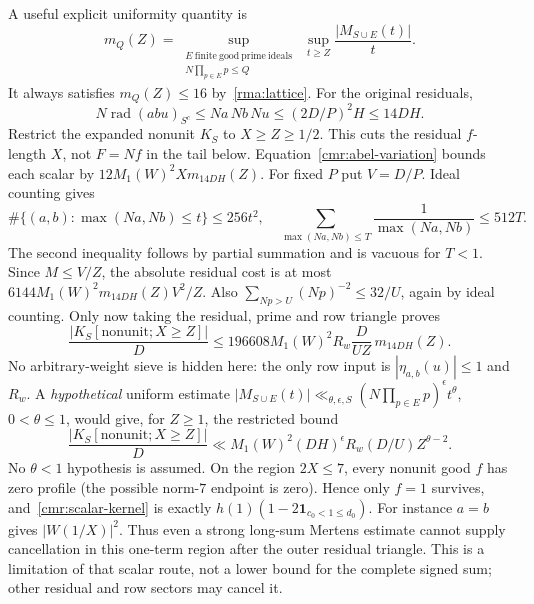 A useful explicit uniformity quantity is
\[
 m_Q(Z)=\sup_{\substack{E\ \mathrm{finite\ good\ prime\ ideals}\\
                       N\prod_{p\in E}p\le Q}}
         \ \sup_{t\ge Z}\frac{|M_{S\cup E}(t)|}{t}.
\]
It always satisfies $m_Q(Z)\le16$ by~\eqref{rma:lattice}.
For the original residuals,
\[
 N\operatorname{rad}(abu)_{S^c}
 \le Na\,Nb\,Nu\le(2D/P)^2H\le14DH.
\]
Restrict the expanded nonunit $K_S$ to $X\ge Z\ge1/2$.
This cuts the residual $f$-length $X$, not $F=Nf$ in the tail below.
Equation~\eqref{cmr:abel-variation} bounds each scalar by
$12M_1(W)^2Xm_{14DH}(Z)$.
For fixed $P$ put $V=D/P$. Ideal counting gives
\[
 \#\{(a,b):\max(Na,Nb)\le t\}\le256t^2,
 \quad
 \sum_{\max(Na,Nb)\le T}\frac1{\max(Na,Nb)}\le512T.
\]
The second inequality follows by partial summation and is vacuous for
$T<1$. Since $M\le V/Z$, the absolute residual cost is at most
$6144M_1(W)^2m_{14DH}(Z)V^2/Z$.
Also $\sum_{Np>U}(Np)^{-2}\le32/U$, again by ideal counting.
Only now taking the residual, prime and row triangle proves
\begin{equation}\label{cmr:mertens-budget}
 \frac{|K_S[\mathrm{nonunit};X\ge Z]|}D
 \le196608M_1(W)^2R_w\frac D{UZ}\,m_{14DH}(Z).
\end{equation}
No arbitrary-weight sieve is hidden here: the only row input is
$|\eta_{a,b}(u)|\le1$ and $R_w$.
A \emph{hypothetical} uniform estimate
$|M_{S\cup E}(t)|\ll_{\theta,\epsilon,S}
 (N\prod_{p\in E}p)^\epsilon t^\theta$, $0<\theta\le1$,
would give, for $Z\ge1$, the restricted bound
\[
 \frac{|K_S[\mathrm{nonunit};X\ge Z]|}D
 \ll M_1(W)^2(DH)^\epsilon R_w(D/U)Z^{\theta-2}.
\]
No $\theta<1$ hypothesis is assumed.
On the region $2X\le7$, every nonunit good $f$ has zero profile
(the possible norm-$7$ endpoint is zero). Hence only $f=1$ survives,
and~\eqref{cmr:scalar-kernel} is exactly
$h(1)(1-2\mathbf1_{c_0<1\le d_0})$.
For instance $a=b$ gives $|W(1/X)|^2$.
Thus even a strong long-sum Mertens estimate cannot supply cancellation
in this one-term region after the outer residual triangle. This is a
limitation of that scalar route, not a lower bound for the complete
signed sum; other residual and row sectors may cancel it.

